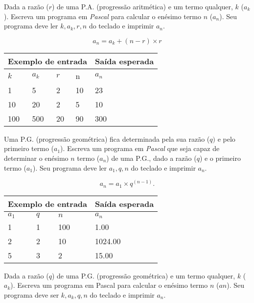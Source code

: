 \item Dada a razão ($r$) de uma P.A. (progressão aritmética) e um termo 
qualquer, $k$ ($a_k$). Escreva um programa em \emph{Pascal} para calcular 
o enésimo termo $n$ ($a_n$). Seu programa deve ler $k, a_k, r, n$ do teclado
e imprimir $a_n$.

\[
a_n = a_k + (n-r) \times r
\]

\begin{center}
\begin{tabular}{|l|l|l|l|l|} \hline
\multicolumn{4}{|c|}{Exemplo de entrada} & Saída esperada \\ \hline
$k$ & $a_k$ & $r$ & n   & $a_n$             \\ \hline
1 & 5 & 2 & 10          & 23                \\ \hline
10 & 20 & 2 & 5         & 10                \\ \hline
100 & 500 & 20 & 90     & 300               \\ \hline
\end{tabular}
\end{center}

\item Uma P.G. (progressão geométrica) fica determinada pela sua razão ($q)$ 
e pelo primeiro termo ($a_1$). Escreva um programa em \emph{Pascal} que seja 
capaz de determinar o enésimo $n$ termo ($a_n$) de uma P.G., dado a razão ($q$) 
e o primeiro termo ($a_1$). Seu programa deve ler $a_1, q, n$ do teclado
e imprimir $a_n$.

\[
a_n = a_1 \times q^{(n-1)}.
\]

\begin{center}
\begin{tabular}{|l|l|l|l|} \hline
\multicolumn{3}{|c|}{Exemplo de entrada} & Saída esperada \\ \hline
$a_1$ & $q$ & $n$   & $a_n$               \\ \hline
1 & 1 & 100         & 1.00                \\ \hline
2 & 2 & 10          & 1024.00             \\ \hline
5 & 3 & 2           & 15.00               \\ \hline
\end{tabular}
\end{center}

\item Dada a razão ($q$) de uma P.G. (progressão geométrica) e um termo 
qualquer, $k$ ($a_k$). Escreva um programa em Pascal para calcular o enésimo 
termo $n$ ($an$). Seu programa deve ser $k, a_k, q, n$ do teclado e imprimir
$a_n$.

